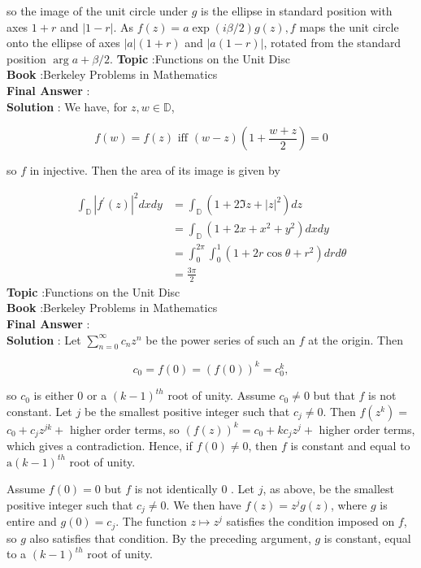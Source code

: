 \documentclass[10pt]{article}
\begin{document}
so the image of the unit circle under $g$ is the ellipse in standard position with axes $1+r$ and $|1-r|$. As $f(z)=a \exp (i \beta / 2) g(z), f$ maps the unit circle onto the ellipse of axes $|a|(1+r)$ and $|a(1-r)|$, rotated from the standard position $\arg a+\beta / 2$.
\textbf{Topic} :Functions on the Unit Disc \\
\textbf{Book} :Berkeley Problems in Mathematics\\
\textbf{Final Answer} :\\


\textbf{Solution} : We have, for $z, w \in \mathbb{D}$,

$$
f(w)=f(z) \text { iff }(w-z)\left(1+\frac{w+z}{2}\right)=0
$$

so $f$ in injective. Then the area of its image is given by

$$
\begin{aligned}
\int_{\mathbb{D}}\left|f^{\prime}(z)\right|^{2} d x d y &=\int_{\mathbb{D}}\left(1+2 \mathfrak{I} z+|z|^{2}\right) d z \\
&=\int_{\mathbb{D}}\left(1+2 x+x^{2}+y^{2}\right) d x d y \\
&=\int_{0}^{2 \pi} \int_{0}^{1}\left(1+2 r \cos \theta+r^{2}\right) d r d \theta \\
&=\frac{3 \pi}{2}
\end{aligned}
$$
\textbf{Topic} :Functions on the Unit Disc \\
\textbf{Book} :Berkeley Problems in Mathematics\\
\textbf{Final Answer} :\\


\textbf{Solution} : Let $\sum_{n=0}^{\infty} c_{n} z^{n}$ be the power series of such an $f$ at the origin. Then

$$
c_{0}=f(0)=(f(0))^{k}=c_{0}^{k},
$$

so $c_{0}$ is either 0 or a $(k-1)^{t h}$ root of unity. Assume $c_{0} \neq 0$ but that $f$ is not constant. Let $j$ be the smallest positive integer such that $c_{j} \neq 0$. Then $f\left(z^{k}\right)=$ $c_{0}+c_{j} z^{j k}+$ higher order terms, so $(f(z))^{k}=c_{0}+k c_{j} z^{j}+$ higher order terms, which gives a contradiction. Hence, if $f(0) \neq 0$, then $f$ is constant and equal to $\mathrm{a}(k-1)^{t h}$ root of unity.

Assume $f(0)=0$ but $f$ is not identically 0 . Let $j$, as above, be the smallest positive integer such that $c_{j} \neq 0$. We then have $f(z)=z^{j} g(z)$, where $g$ is entire and $g(0)=c_{j}$. The function $z \mapsto z^{j}$ satisfies the condition imposed on $f$, so $g$ also satisfies that condition. By the preceding argument, $g$ is constant, equal to a $(k-1)^{t h}$ root of unity.
\end{document}
